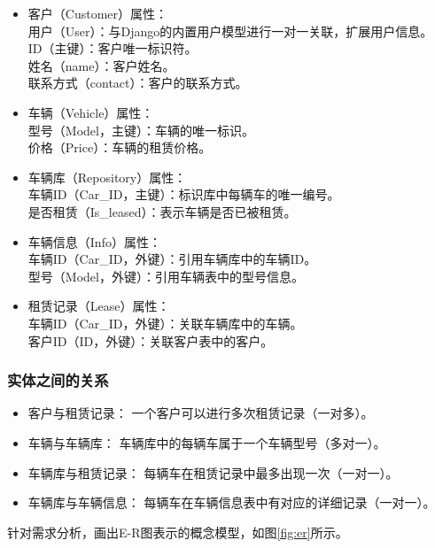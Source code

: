 \documentclass[UTF8,a4paper,12pt]{ctexart}
\begin{document}
\begin{itemize}[leftmargin=0.3cm]
    \item 客户（Customer）属性：\\
    用户（User）：与Django的内置用户模型进行一对一关联，扩展用户信息。\\
    ID（主键）：客户唯一标识符。\\
    姓名（name）：客户姓名。\\
    联系方式（contact）：客户的联系方式。\\
\vspace{-0.7cm}
    \item 车辆（Vehicle）属性：\\
    型号（Model，主键）：车辆的唯一标识。\\
    价格（Price）：车辆的租赁价格。\\

    \item 车辆库（Repository）属性：\\
    车辆ID（Car\_ID，主键）：标识库中每辆车的唯一编号。\\
    是否租赁（Is\_leased）：表示车辆是否已被租赁。\\
\vspace{-0.7cm}
    \item 车辆信息（Info）属性：\\
    车辆ID（Car\_ID，外键）：引用车辆库中的车辆ID。\\
    型号（Model，外键）：引用车辆表中的型号信息。\\
\vspace{-0.7cm}    
    \item 租赁记录（Lease）属性：\\
    车辆ID（Car\_ID，外键）：关联车辆库中的车辆。\\
    客户ID（ID，外键）：关联客户表中的客户。\\
\end{itemize}

\subsubsection{实体之间的关系} 
\begin{itemize}[leftmargin=0.3cm]
\item 客户与租赁记录：
一个客户可以进行多次租赁记录（一对多）。

\item 车辆与车辆库：
车辆库中的每辆车属于一个车辆型号（多对一）。

\item 车辆库与租赁记录：
每辆车在租赁记录中最多出现一次（一对一）。

\item 车辆库与车辆信息：
每辆车在车辆信息表中有对应的详细记录（一对一）。
\end{itemize}
针对需求分析，画出E-R图表示的概念模型，如图\ref{fig:er}所示。
\end{document}
